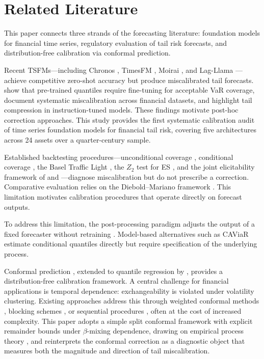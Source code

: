 \documentclass[preprint,11pt,authoryear]{elsarticle}
\newcommand{\1}{\boldsymbol{1}}
\begin{document}
	\section{Related Literature}
	\label{sec:lit}
	
	This paper connects three strands of the forecasting literature:
	foundation models for financial time series, regulatory
	evaluation of tail risk forecasts, and distribution-free
	calibration via conformal prediction.
	
	Recent TSFMs---including Chronos
	\citep{ansari2024chronos,ansari2025chronos2}, TimesFM
	\citep{das2024timesfm}, Moirai
	\citep{woo2024moirai,liu2024moirai2}, and Lag-Llama
	\citep{rasul2024lagllama}---achieve competitive zero-shot
	accuracy but produce miscalibrated tail forecasts.
	\citet{goel2024tsfmvar} show that pre-trained quantiles
	require fine-tuning for acceptable VaR coverage,
	\citet{rahimikia2025revisiting} document systematic
	miscalibration across financial datasets, and
	\citet{pele2025llmvar} highlight tail compression in
	instruction-tuned models. These findings motivate post-hoc
	correction approaches. This study provides the first systematic
	calibration audit of time series foundation models for financial
	tail risk, covering five architectures across 24 assets over a
	quarter-century sample.

	Established backtesting procedures---unconditional coverage
	\citep{kupiec1995}, conditional coverage
	\citep{christoffersen1998}, the Basel Traffic Light
	\citep{basel1996}, the $Z_2$ test for ES
	\citep{acerbi2014back}, and the joint elicitability framework
	of \citet{fissler2016higher} and
	\citet{nolde2017elicitability}---diagnose miscalibration but
	do not prescribe a correction. Comparative evaluation relies
	on the Diebold--Mariano framework
	\citep{diebold1995comparing,harvey1997testing}. This
	limitation motivates calibration procedures that operate
	directly on forecast outputs.
	
	To address this limitation, the post-processing paradigm adjusts
	the output of a fixed forecaster without retraining
	\citep{gneiting2013combining, brehmer2021properification,
		taillardat2016calibrated}. Model-based
	alternatives such as CAViaR \citep{engle2004caviar} estimate
	conditional quantiles directly but require specification of
	the underlying process.
	
	Conformal prediction \citep{vovk2005algorithmic}, extended to
	quantile regression by \citet{romano2019conformalized},
	provides a distribution-free calibration framework. A central
	challenge for financial applications is temporal dependence:
	exchangeability is violated under volatility clustering.
	Existing approaches address this through weighted conformal
	methods \citep{barber2023conformal}, blocking schemes
	\citep{chernozhukov2018exact}, or sequential procedures
	\citep{gibbs2021adaptive, zaffran2022conformal,
		xu2024conformal}, often at the cost of increased complexity.
	This paper adopts a simple split conformal framework with
	explicit remainder bounds under $\beta$-mixing dependence,
	drawing on empirical process theory
	\citep{rio2017asymptotic, yu1994rates}, and reinterprets the
	conformal correction as a diagnostic object that measures both
	the magnitude and direction of tail miscalibration.
	
\end{document}
